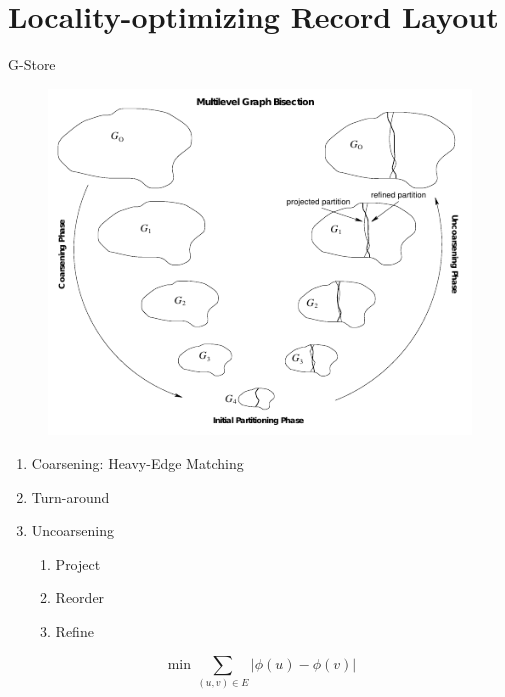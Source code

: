 \documentclass[rgb]{beamer}
\begin{document}
    \section{Locality-optimizing Record Layout}
        \begin{frame}{G-Store}
            \begin{figure}[H]
                \begin{center}
                \includegraphics[keepaspectratio, height=0.8\textheight, width=\textwidth]{img/multilevel.png}\\
                \end{center}
            \end{figure}
            
            \framebreak
            \vfill\vspace{0pt}
            \begin{enumerate}
             \item Coarsening: Heavy-Edge Matching
             \item Turn-around
             \item Uncoarsening
                \begin{enumerate}
                 \item Project
                 \item Reorder
                 \item Refine\\ [3em]
                \end{enumerate}
            \end{enumerate}
             \[ \min \sum_{(u,v) \in E} |\phi(u) - \phi(v)| \] 
             

\end{frame}
\end{document}
